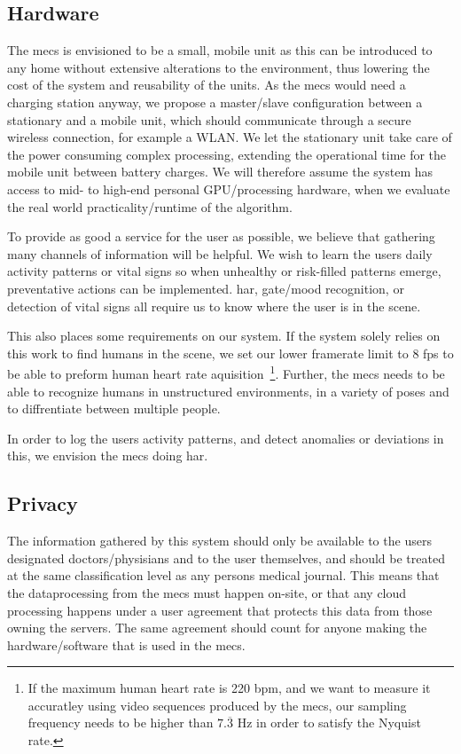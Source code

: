 \subsection{Hardware}
The \gls{mecs} is envisioned to be a small, mobile unit as this can be introduced to any home without extensive alterations to the environment, thus lowering the cost of the system and reusability of the units. As the \gls{mecs} would need a charging station anyway, we propose a master/slave configuration between a stationary and a mobile unit, which should communicate through a secure wireless connection, for example a WLAN. We let the stationary unit take care of the power consuming complex processing, extending the operational time for the mobile unit between battery charges. We will therefore assume the system has access to mid- to high-end personal GPU/processing hardware, when we evaluate the real world practicality/runtime of the algorithm.

To provide as good a service for the user as possible, we believe that gathering many channels of information will be helpful. We wish to learn the users daily activity patterns or vital signs so when unhealthy or risk-filled patterns emerge, preventative actions can be implemented. \gls{har}, gate/mood recognition, or detection of vital signs all require us to know where the user is in the scene.

This also places some requirements on our system. If the system solely relies on this work to find humans in the scene, we set our lower framerate limit to 8 fps to be able to preform human heart rate aquisition~\cite{Wu12Eulerian}\footnote{If the maximum human heart rate is 220 bpm, and we want to measure it accuratley using video sequences produced by the \gls{mecs}, our sampling frequency needs to be higher than $7.\overline{3}$ Hz in order to satisfy the Nyquist rate.}. Further, the \gls{mecs} needs to be able to recognize humans in unstructured environments, in a variety of poses and to diffrentiate between multiple people.

In order to log the users activity patterns, and detect anomalies or deviations in this, we envision the \gls{mecs} doing \gls{har}.

\subsection{Privacy}
The information gathered by this system should only be available to the users designated doctors/physisians and to the user themselves, and should be treated at the same classification level as any persons medical journal. This means that the dataprocessing from the \gls{mecs} must happen on-site, or that any cloud processing happens under a user agreement that protects this data from those owning the servers. The same agreement should count for anyone making the hardware/software that is used in the \gls{mecs}.

